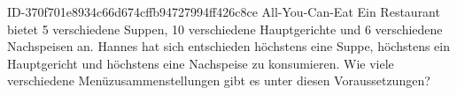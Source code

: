 \begin{exercise}
      {ID-370f701e8934c66d674cffb94727994ff426c8ce}
      {All-You-Can-Eat}
  \ifproblem\problem
    Ein Restaurant bietet 5 verschiedene Suppen, 10 verschiedene Hauptgerichte
    und 6 verschiedene Nachspeisen an. Hannes hat sich entschieden höchstens
    eine Suppe, höchstens ein Hauptgericht und höchstens eine Nachspeise zu
    konsumieren. Wie viele verschiedene Menüzusammenstellungen gibt es unter
    diesen Voraussetzungen?
  \fi
\end{exercise}
